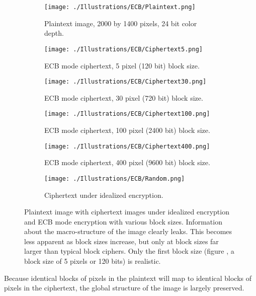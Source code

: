 \documentclass[11pt,ebook,table,dvipsnames]{memoir}
\begin{document}
\begin{figure}[p]
  \centering

  \begin{subfigure}[b]{.45\textwidth}
    \texttt{[image: ./Illustrations/ECB/Plaintext.png]}
    \caption{Plaintext image, 2000 by 1400 pixels, 24 bit color depth.}
    \label{fig:ECBDemoPlaintext}
  \end{subfigure}
  \quad
  \begin{subfigure}[b]{.45\textwidth}
    \texttt{[image: ./Illustrations/ECB/Ciphertext5.png]}
    \caption{ECB mode ciphertext, 5 pixel (120 bit) block size.}
    \label{fig:ECBDemo5px}
  \end{subfigure}

  \begin{subfigure}[b]{.45\textwidth}
    \texttt{[image: ./Illustrations/ECB/Ciphertext30.png]}
    \caption{ECB mode ciphertext, 30 pixel (720 bit) block size.}
  \end{subfigure}
  \quad
  \begin{subfigure}[b]{.45\textwidth}
    \texttt{[image: ./Illustrations/ECB/Ciphertext100.png]}
    \caption{ECB mode ciphertext, 100 pixel (2400 bit) block size.}
  \end{subfigure}

  \begin{subfigure}[b]{.45\textwidth}
    \texttt{[image: ./Illustrations/ECB/Ciphertext400.png]}
    \caption{ECB mode ciphertext, 400 pixel (9600 bit) block size.}
  \end{subfigure}
  \quad
  \begin{subfigure}[b]{.45\textwidth}
    \texttt{[image: ./Illustrations/ECB/Random.png]}
    \caption{Ciphertext under idealized encryption.}
    \label{fig:ECBDemoIdealizedCiphertext}
  \end{subfigure}

  \caption{Plaintext image with ciphertext images under idealized
    encryption and ECB mode encryption with various block sizes.
    Information about the macro-structure of the image clearly leaks.
    This becomes less apparent as block sizes increase, but only at
    block sizes far larger than typical block ciphers. Only the first
    block size (figure , a block size of 5
    pixels or 120 bits) is realistic.}
\end{figure}

Because identical blocks of pixels in the plaintext will map to
identical blocks of pixels in the ciphertext, the global structure of
the image is largely preserved.
\end{document}
